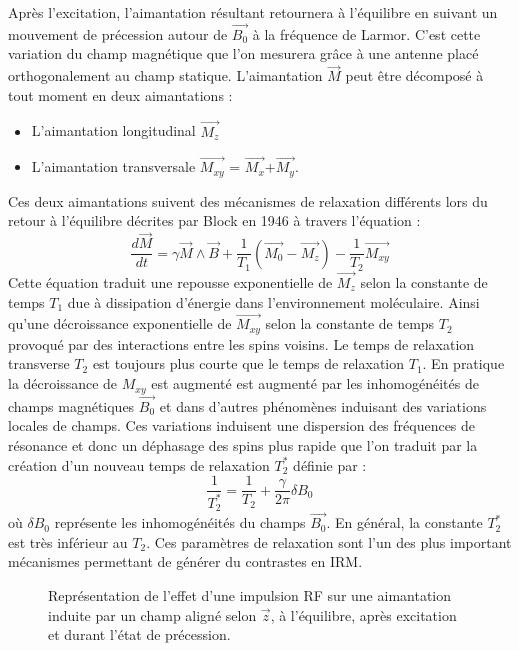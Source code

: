 Après l'excitation, l'aimantation résultant retournera à l'équilibre en suivant un mouvement de précession autour de $\overrightarrow{B_0}$ à la fréquence de Larmor.  C'est cette variation du champ magnétique que l'on mesurera grâce à une antenne placé orthogonalement au champ statique. L'aimantation $\overrightarrow{M}$ peut être décomposé à tout moment en deux aimantations :
\begin{itemize}
	\item L'aimantation longitudinal $\overrightarrow{	M_z}$ 
	\item L'aimantation transversale $\overrightarrow{	M_{xy}}$ = $\overrightarrow{M_x}$+$\overrightarrow{M_y}$.
\end{itemize}
Ces deux aimantations suivent des mécanismes de relaxation différents lors du retour à l'équilibre décrites par Block en 1946 à travers l'équation \cite{bloch1946nuclear} :
	\begin{equation}
\frac{d\overrightarrow{M}}{dt}=\gamma\overrightarrow{M}\wedge\overrightarrow{B}+\frac{1}{T_1}(\overrightarrow{M_0}-\overrightarrow{M_z})-\frac{1}{T_2}\overrightarrow{M_{xy}}
\end{equation}
Cette équation traduit une repousse exponentielle de $\overrightarrow{M_z}$ selon la constante de temps $T_1$ due à dissipation d'énergie dans l'environnement moléculaire. Ainsi qu'une décroissance exponentielle de $\overrightarrow{	M_{xy}}$ selon la constante de temps $T_2$ provoqué par des interactions entre les spins voisins.
Le temps de relaxation transverse $T_2$ est toujours plus courte que le temps de relaxation $T_1$.
En pratique la décroissance de $M_{xy}$ est augmenté est augmenté par les inhomogénéités de champs magnétiques $\overrightarrow{B_0}$ et dans d'autres phénomènes induisant des variations locales de champs. Ces variations induisent une dispersion des fréquences de résonance et donc un déphasage des spins plus rapide que l'on traduit par la création d'un nouveau temps de relaxation $T_2^*$ définie par :
 	\begin{equation}
 		\frac{1}{T_2^*}=\frac{1}{T_2}+\frac{\gamma}{2\pi}\delta B_0
 	\end{equation}
où $\delta B_0$ représente les inhomogénéités du champs $\overrightarrow{B_0}$. En général, la constante $T_2^*$ est très inférieur au $T_2$. Ces paramètres de relaxation sont l'un des plus important mécanismes permettant de générer du contrastes en IRM.

\begin{figure}[h]
\centering

\caption[Angle de bascule]{Représentation de l'effet d'une impulsion RF sur une aimantation induite par un champ aligné selon $\overrightarrow{z}$, à l'équilibre, après excitation et durant l'état de précession.}
\end{figure}
